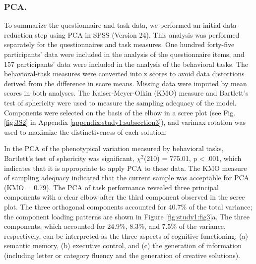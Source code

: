 \subsubsection{PCA.} 
To summarize the questionnaire and task data, we performed an initial data-reduction step using PCA in SPSS (Version 24). This analysis was performed separately for the questionnaires and task measures. One hundred forty-five participants’ data were included in the analysis of the questionnaire items, and 157 participants’ data were included in the analysis of the behavioral tasks. The behavioral-task measures were converted into z scores to avoid data distortions derived from the difference in score means. Missing data were imputed by mean scores in both analyses. The Kaiser-Meyer-Olkin (KMO) measure and Bartlett’s test of sphericity were used to measure the sampling adequacy of the model. Components were selected on the basis of the elbow in a scree plot (see Fig.\ref{fig:3S2} in Appendix \ref{appendix:study1:subsection3}), and varimax rotation was used to maximize the distinctiveness of each solution.

In the PCA of the phenotypical variation measured by behavioral tasks, Bartlett’s test of sphericity was significant, 
$\chi^{2}$(210) = 775.01, 
p < .001, which indicates that it is appropriate to apply PCA to these data. The KMO measure of sampling adequacy indicated that the current sample was acceptable for PCA (KMO = 0.79). The PCA of task performance revealed three principal components with a clear elbow after the third component observed in the scree plot. The three orthogonal components accounted for 40.7\% of the total variance; the component loading patterns are shown in Figure \ref{fig:study1:fig3}a. The three components, which accounted for 24.9\%, 8.3\%, and 7.5\% of the variance, respectively, can be interpreted as the three aspects of cognitive functioning: (a) semantic memory, (b) executive control, and (c) the generation of information (including letter or category fluency and the generation of creative solutions).

